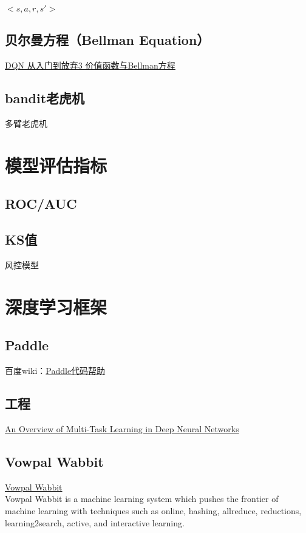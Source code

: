 \documentclass[10pt,a4paper]{ctexbook}
\begin{document}
$<s, a, r, s'>$

\subsection{贝尔曼方程（Bellman Equation）}
\href{https://zhuanlan.zhihu.com/p/21340755?refer=intelligentunit}{DQN 从入门到放弃3 价值函数与Bellman方程}

\subsection{bandit老虎机}
多臂老虎机


\section{模型评估指标}
\subsection{ROC/AUC}
\subsection{KS值}
风控模型

\section{深度学习框架}
\subsection{Paddle}
百度wiki：\href{http://wiki.baidu.com/pages/viewpage.action?pageId=38550738}{Paddle代码帮助}

\subsection{工程}
\href{http://ruder.io/multi-task/index.html}{An Overview of Multi-Task Learning in Deep Neural Networks}

\subsection{Vowpal Wabbit}
\href{https://github.com/JohnLangford/vowpal_wabbit}{Vowpal Wabbit}
\\Vowpal Wabbit is a machine learning system which pushes the frontier of machine learning with techniques such as online, hashing, allreduce, reductions, learning2search, active, and interactive learning.
\end{document}
